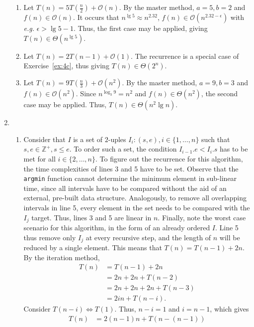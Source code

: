 \documentclass[12pt]{article}
\begin{document}
\begin{enumerate}
\begin{enumerate}
    \item\label{ex:7a} Let $T(n) = 5T(\frac{n}{2}) + \mathcal{O}(n)$. By the master method, $a = 5, b = 2$ and $f(n) \in \mathcal{O}(n)$. It occurs that $n^{\lg 5} \approx n^{2.32}$, $f(n) \in \mathcal{O}(n^{2.32 - \epsilon})$ with \emph{e.g.} $\epsilon > \lg 5 - 1$. Thus, the first case may be applied, giving $T(n) \in \Theta(n^{\lg 5})$.
    \item Let $T(n) = 2T(n - 1) + \mathcal{O}(1)$. The recurrence is a special case of Exercise~\ref{ex:4c}, thus giving $T(n) \in \Theta(2^{n})$.
    \item Let $T(n) = 9T(\frac{n}{3}) + \mathcal{O}(n^{2})$. By the master method, $a = 9, b = 3$ and $f(n) \in \mathcal{O}(n^{2})$. Since $n^{\log_{3} 9} = n^{2}$ and $f(n) \in \Theta(n^{2})$, the second case may be applied. Thus, $T(n) \in \Theta(n^{2} \lg n)$.
  \end{enumerate}
  \item
  \begin{enumerate}
    \item Consider that $I$ is a set of $2$-uples $I_{i} : (s, e), i \in \{1, \dots, n\}$ such that $s, e \in \mathbb{Z}^{+}, s \leq e$. To order such a set, the condition $I_{i - 1}.e < I_{i}.s$ has to be met for all $i \in \{2, \dots, n\}$. To figure out the recurrence for this algorithm, the time complexities of lines 3 and 5 have to be set. Observe that the \texttt{argmin} function cannot determine the minimum element in sub-linear time, since all intervals have to be compared without the aid of an external, pre-built data structure. Analogously, to remove all overlapping intervals in line 5, every element in the set needs to be compared with the $I_{j}$ target. Thus, lines 3 and 5 are linear in $n$. Finally, note the worst case scenario for this algorithm, in the form of an already ordered $I$. Line 5 thus remove only $I_{j}$ at every recursive step, and the length of $n$ will be reduced by a single element. This means that $T(n) = T(n - 1) + 2n$. By the iteration method,
    \begin{align*}
      T(n) &= T(n - 1) + 2n \\
      &= 2n + 2n + T(n - 2) \\
      &= 2n + 2n + 2n + T(n - 3) \\
      &= 2in + T(n - i).
    \end{align*}
    Consider $T(n - i) \Leftrightarrow T(1)$. Thus, $n - i = 1$ and $i = n - 1$, which gives
    \begin{align*}
      T(n) &= 2(n - 1)n + T(n - (n - 1)) \\

\end{align*}
\end{enumerate}
\end{enumerate}
\end{document}
